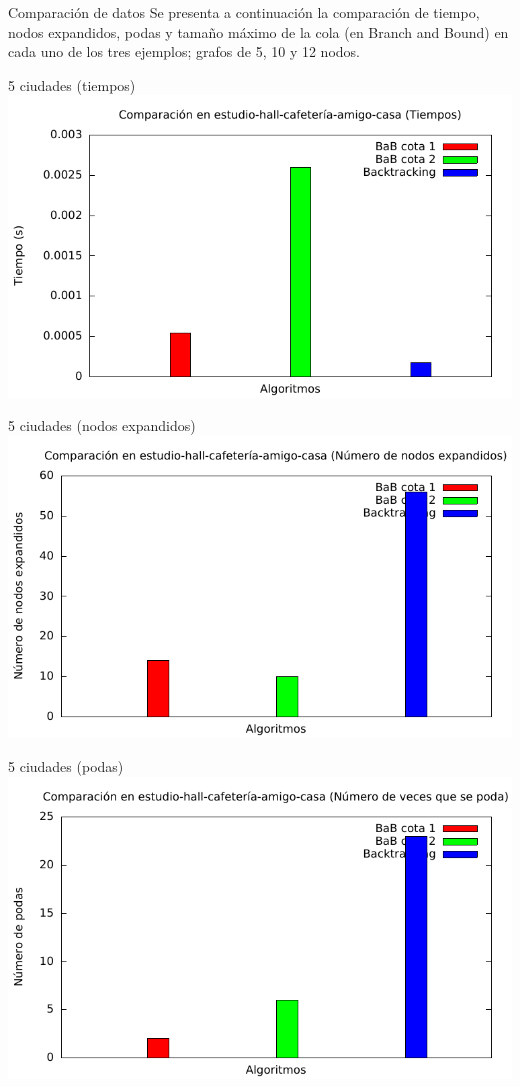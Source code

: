 \begin{frame}{Comparación de datos}
	Se presenta a continuación la comparación de tiempo, nodos expandidos, podas y tamaño máximo de la cola (en Branch and Bound) en cada uno de los tres ejemplos; grafos de 5, 10 y 12 nodos.
\end{frame}

\begin{frame}{5 ciudades (tiempos)}
\includegraphics[width=\textwidth]{img/barras_e-h-c-a-c5_t}
\end{frame}

\begin{frame}{5 ciudades (nodos expandidos)}
\includegraphics[width=\textwidth]{img/barras_e-h-c-a-c5_nodos}
\end{frame}

\begin{frame}{5 ciudades (podas)}
\includegraphics[width=\textwidth]{img/barras_e-h-c-a-c5_poda}
\end{frame}

